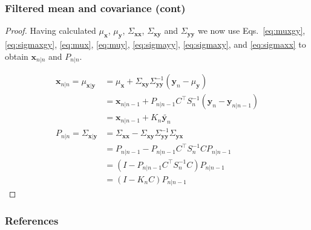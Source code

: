 \begin{frame}
    \frametitle{Filtered mean and covariance (cont)}
    \scriptsize

    \begin{proof}
    Having calculated $\mu_{\mathbf{x}}$, $\mu_{\mathbf{y}}$,
    $\Sigma_{\mathbf{x}\mathbf{x}}$, $\Sigma_{\mathbf{x}\mathbf{y}}$ and
    $\Sigma_{\mathbf{y}\mathbf{y}}$ we now use Eqs.~\ref{eq:muxgy},
    \ref{eq:sigmaxgy}, \ref{eq:mux},  \ref{eq:muy},  \ref{eq:sigmayy},
    \ref{eq:sigmaxy}, and \ref{eq:sigmaxx} to  
    obtain $\mathbf{x}_{n|n}$ and $P_{n|n}$.

    \begin{align*}
        \mathbf{x}_{n|n}=\mu_{\mathbf{x}|\mathbf{y}}&=\mu_{\mathbf{x}} + \Sigma_{\mathbf{x}\mathbf{y}}\Sigma_{\mathbf{y}\mathbf{y}}^{-1}(\mathbf{y}_n-\mu_{\mathbf{y}})\\
                                                    &=\mathbf{x}_{n|n-1}+P_{n|n-1}C^\intercal S_n^{-1}(\mathbf{y}_n-\mathbf{y}_{n|n-1})\\
                                                    &=\mathbf{x}_{n|n-1}+K_n\tilde{\mathbf{y}_n}\\
        P_{n|n}=\Sigma_{\mathbf{x}|\mathbf{y}}&=\Sigma_{\mathbf{x}\mathbf{x}}-\Sigma_{\mathbf{x}\mathbf{y}}\Sigma_{\mathbf{y}\mathbf{y}}^{-1}\Sigma_{\mathbf{y}\mathbf{x}}\\
                                              &=P_{n|n-1}-P_{n|n-1}C^\intercal S_n^{-1}CP_{n|n-1}\\
                                              &=(I-P_{n|n-1}C^\intercal S_n^{-1}C)P_{n|n-1}\\
                                              &=(I-K_nC)P_{n|n-1}
    \end{align*}
    \end{proof}
    \normalsize
\end{frame}

\begin{frame}
\frametitle{References}
\tiny{


}
\end{frame}


 
